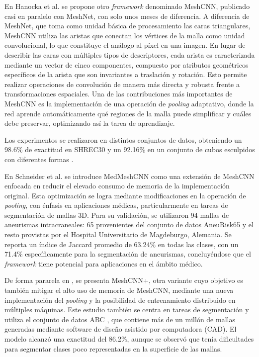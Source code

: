 En Hanocka et al. \cite{hanocka2019meshcnn} se propone otro \textit{framework} denominado MeshCNN, publicado casi en paralelo con MeshNet, con solo unos meses de diferencia. A diferencia de MeshNet, que toma como unidad básica de procesamiento las caras triangulares, MeshCNN utiliza las aristas que conectan los vértices de la malla como unidad convolucional, lo que constituye el análogo al píxel en una imagen. En lugar de describir las caras con múltiples tipos de descriptores, cada arista es caracterizada mediante un vector de cinco componentes, compuesto por atributos geométricos específicos de la arista que son invariantes a traslación y rotación. Esto permite realizar operaciones de convolución de manera más directa y robusta frente a transformaciones espaciales. Una de las contribuciones más importantes de MeshCNN es la implementación de una operación de \textit{pooling} adaptativo, donde la red aprende automáticamente qué regiones de la malla puede simplificar y cuáles debe preservar, optimizando así la tarea de aprendizaje.

Los experimentos se realizaron en distintos conjuntos de datos, obteniendo un 98.6\% de exactitud en SHREC30 \cite{lian2011shape} y un 92.16\% en un conjunto de cubos esculpidos con diferentes formas \cite{latecki2000shape}.

En Schneider et al. \cite{schneider_medmeshcnn_2021} se introduce MedMeshCNN como una extensión de MeshCNN enfocada en reducir el elevado consumo de memoria de la implementación original. Esta optimización se logra mediante modificaciones en la operación de \textit{pooling}, con énfasis en aplicaciones médicas, particularmente en tareas de segmentación de mallas 3D. Para su validación, se utilizaron 94 mallas de aneurismas intracraneales: 65 provenientes del conjunto de datos AneuRisk65 \cite{sangalli2014aneurisk65} y el resto provistas por el Hospital Universitario de Magdeburgo, Alemania. Se reporta un índice de Jaccard promedio de 63.24\% en todas las clases, con un 71.4\% específicamente para la segmentación de aneurismas, concluyéndose que el \textit{framework} tiene potencial para aplicaciones en el ámbito médico.

De forma pararela en \cite{mandado_surface_2021}, se presenta MeshCNN+, otra variante cuyo objetivo es también mitigar el alto uso de memoria de MeshCNN, mediante una nueva implementación del \textit{pooling} y la posibilidad de entrenamiento distribuido en múltiples máquinas. Este estudio también se centra en tareas de segmentación y utiliza el conjunto de datos ABC \cite{Koch_2019_CVPR}, que contiene más de un millón de mallas generadas mediante software de diseño asistido por computadora (CAD). El modelo alcanzó una exactitud del 86.2\%, aunque se observó que tenía dificultades para segmentar clases poco representadas en la superficie de las mallas.

